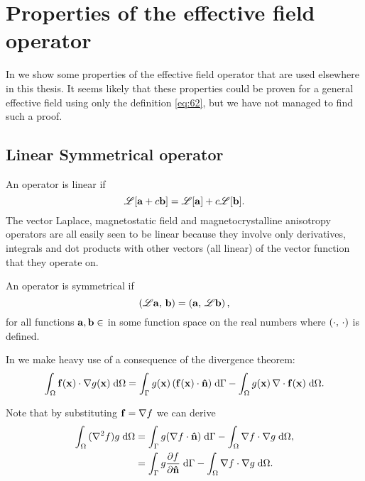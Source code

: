 \newtheorem{theorem}{Theorem}

\newcommand{\ff}{f}
\newcommand{\gf}{g}

\newcommand{\knl}{k}

\chapter{Properties of the effective field operator}
\label{sec:properties-of-field-operators}

In  we show some properties of the effective field operator that are used elsewhere in this thesis.
It seems likely that these properties could be proven for a general effective field using only the definition \cref{eq:62}, but we have not managed to find such a proof.

\section{Linear Symmetrical operator}
\label{sec:linear-symm-field-operators}

An operator is linear if
\begin{equation}
  \mathscr{L}[{\boldsymbol{\mathrm{a}}} + c{\boldsymbol{\mathrm{b}}}] = \mathscr{L}[{\boldsymbol{\mathrm{a}}}] + c\mathscr{L}[{\boldsymbol{\mathrm{b}}}].
\end{equation}
The vector Laplace, magnetostatic field and magnetocrystalline anisotropy operators are all easily seen to be linear because they involve only derivatives, integrals and dot products with other vectors (all linear) of the vector function that they operate on.

An operator is symmetrical if
\begin{equation}
  \left(\mathscr{L} {\boldsymbol{\mathrm{a}}},\, {\boldsymbol{\mathrm{b}}} \right) = \left({\boldsymbol{\mathrm{a}}},\, \mathscr{L} {\boldsymbol{\mathrm{b}}} \right),
\end{equation}
for all functions ${\boldsymbol{\mathrm{a}}}, {\boldsymbol{\mathrm{b}}} \in $ in some function space on the real numbers where $\left(\cdot,\, \cdot \right)$ is defined.

In  we make heavy use of a consequence of the divergence theorem:
\begin{equation}
  \intd{\fv(\xv) \cdot \grad \gf(\xv)}
  = \intb{\gf(\xv) \, (\fv(\xv) \cdot \nv)} - \intd{\gf(\xv) \, \div \fv(\xv)}.
  \label{eqn:grad-divergence}
\end{equation}

Note that by substituting $\fv = \grad \ff$ we can derive
\begin{equation}
  \begin{aligned}
    \intd{(\lap \ff) \gf}
    &= \intb{\gf (\grad \ff \cdot \nv)} - \intd{\grad \ff \cdot \grad \gf}, \\
    &= \intb{\gf \ddn{\ff}} - \intd{\grad \ff \cdot \grad \gf}.
    \label{eqn:laplace-divergence}
  \end{aligned}
\end{equation}

